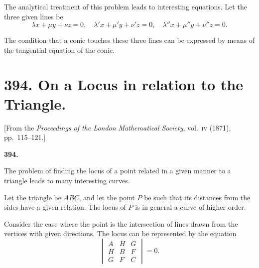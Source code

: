 \documentclass[11pt,a4paper]{article}
\theoremstyle{plain}
\begin{document}
The analytical treatment of this problem leads to interesting equations. Let the three given lines be
\begin{equation}
\lambda x + \mu y + \nu z = 0, \quad \lambda' x + \mu' y + \nu' z = 0, \quad \lambda'' x + \mu'' y + \nu'' z = 0.
\end{equation}

The condition that a conic touches these three lines can be expressed by means of the tangential equation of the conic.

\newpage

\par\noindent{}\par

\newpage

\section*{394. On a Locus in relation to the Triangle.}
\label{sec:394}
\begin{center}
[From the \textit{Proceedings of the London Mathematical Society}, vol.~\textsc{iv} (1871), pp.~115--121.]
\end{center}

\setcounter{equation}{0}

\textbf{394.}

The problem of finding the locus of a point related in a given manner to a triangle leads to many interesting curves.

Let the triangle be $ABC$, and let the point $P$ be such that its distances from the sides have a given relation. The locus of $P$ is in general a curve of higher order.

Consider the case where the point is the intersection of lines drawn from the vertices with given directions. The locus can be represented by the equation
\begin{equation}
\begin{vmatrix}
A & H & G \\
H & B & F \\
G & F & C
\end{vmatrix} = 0.
\end{equation}
\end{document}
